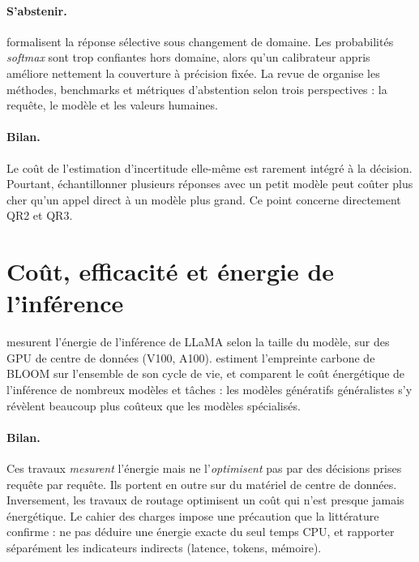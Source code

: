\documentclass[11pt,a4paper]{article}
\begin{document}
\paragraph{S'abstenir.} \citet{kamath2020selective} formalisent la réponse sélective sous changement de
domaine. Les probabilités \textit{softmax} sont trop confiantes hors domaine, alors qu'un calibrateur
appris améliore nettement la couverture à précision fixée. La revue de \citet{wen2024abstention}
organise les méthodes, benchmarks et métriques d'abstention selon trois perspectives : la requête, le
modèle et les valeurs humaines.

\paragraph{Bilan.} Le coût de l'estimation d'incertitude elle-même est rarement intégré à la décision.
Pourtant, échantillonner plusieurs réponses avec un petit modèle peut coûter plus cher qu'un appel
direct à un modèle plus grand. Ce point concerne directement QR2 et QR3.

\section{Coût, efficacité et énergie de l'inférence}\label{sec:energie}

\citet{samsi2023watts} mesurent l'énergie de l'inférence de LLaMA selon la taille du modèle, sur des
GPU de centre de données (V100, A100). \citet{luccioni2022bloom} estiment l'empreinte carbone de BLOOM
sur l'ensemble de son cycle de vie, et \citet{luccioni2024power} comparent le coût énergétique de
l'inférence de nombreux modèles et tâches : les modèles génératifs généralistes s'y révèlent beaucoup
plus coûteux que les modèles spécialisés.

\paragraph{Bilan.} Ces travaux \emph{mesurent} l'énergie mais ne l'\emph{optimisent} pas par des
décisions prises requête par requête. Ils portent en outre sur du matériel de centre de données.
Inversement, les travaux de routage optimisent un coût qui n'est presque jamais énergétique. Le cahier
des charges impose une précaution que la littérature confirme : ne pas déduire une énergie exacte du
seul temps CPU, et rapporter séparément les indicateurs indirects (latence, tokens, mémoire).
\end{document}
